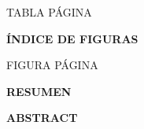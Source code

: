 \documentclass[12pt]{article}
\begin{document}
\begin{flushright} \small
TABLA \hspace{11.6cm} PÁGINA\\
\end{flushright}

\vspace{-1.0cm}

\begin{spacing}{1.2}
{\fontsize{10}{10}\selectfont \listoftables}
\end{spacing}

\newpage

\begin{center}
{\fontsize{14}{14}\selectfont \bf ÍNDICE DE FIGURAS}\\
\end{center}
{}


\begin{flushright} \small
FIGURA \hspace{11.45cm} PÁGINA\\
\end{flushright}

\vspace{-1.0cm}

\begin{spacing}{1.2}
{\fontsize{10}{10}\selectfont \listoffigures}
\end{spacing}

\newpage


\begin{center}
{\fontsize{14}{14}\selectfont \bf RESUMEN}\\
\end{center}
{}



\newpage

\begin{center}
{\fontsize{14}{14}\selectfont \bf ABSTRACT}\\
\end{center}
{}



\newpage

\end{document}
